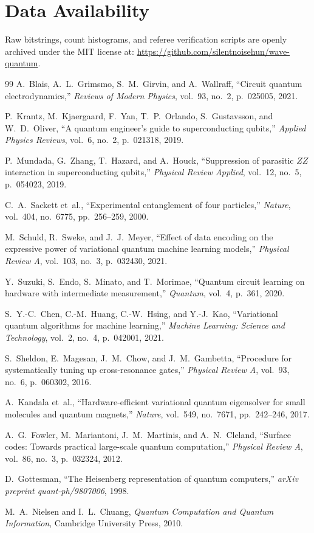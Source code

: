 \documentclass[11pt,a4paper]{article}
\begin{document}
\section*{Data Availability}
Raw bitstrings, count histograms, and referee verification scripts are openly archived under the MIT license at: \url{https://github.com/silentnoisehun/wave-quantum}.

\begin{thebibliography}{99}
A.~Blais, A.~L.~Grimsmo, S.~M.~Girvin, and A.~Wallraff,
``Circuit quantum electrodynamics,''
\emph{Reviews of Modern Physics}, vol.~93, no.~2, p.~025005, 2021.

P.~Krantz, M.~Kjaergaard, F.~Yan, T.~P.~Orlando, S.~Gustavsson, and W.~D.~Oliver,
``A quantum engineer's guide to superconducting qubits,''
\emph{Applied Physics Reviews}, vol.~6, no.~2, p.~021318, 2019.

P.~Mundada, G.~Zhang, T.~Hazard, and A.~Houck,
``Suppression of parasitic $ZZ$ interaction in superconducting qubits,''
\emph{Physical Review Applied}, vol.~12, no.~5, p.~054023, 2019.

C.~A.~Sackett et~al.,
``Experimental entanglement of four particles,''
\emph{Nature}, vol.~404, no.~6775, pp.~256--259, 2000.

M.~Schuld, R.~Sweke, and J.~J.~Meyer,
``Effect of data encoding on the expressive power of variational quantum machine learning models,''
\emph{Physical Review A}, vol.~103, no.~3, p.~032430, 2021.

Y.~Suzuki, S.~Endo, S.~Minato, and T.~Morimae,
``Quantum circuit learning on hardware with intermediate measurement,''
\emph{Quantum}, vol.~4, p.~361, 2020.

S.~Y.-C.~Chen, C.-M.~Huang, C.-W.~Hsing, and Y.-J.~Kao,
``Variational quantum algorithms for machine learning,''
\emph{Machine Learning: Science and Technology}, vol.~2, no.~4, p.~042001, 2021.

S.~Sheldon, E.~Magesan, J.~M.~Chow, and J.~M.~Gambetta,
``Procedure for systematically tuning up cross-resonance gates,''
\emph{Physical Review A}, vol.~93, no.~6, p.~060302, 2016.

A.~Kandala et~al.,
``Hardware-efficient variational quantum eigensolver for small molecules and quantum magnets,''
\emph{Nature}, vol.~549, no.~7671, pp.~242--246, 2017.

A.~G.~Fowler, M.~Mariantoni, J.~M.~Martinis, and A.~N.~Cleland,
``Surface codes: Towards practical large-scale quantum computation,''
\emph{Physical Review A}, vol.~86, no.~3, p.~032324, 2012.

D.~Gottesman,
``The Heisenberg representation of quantum computers,''
\emph{arXiv preprint quant-ph/9807006}, 1998.

M.~A.~Nielsen and I.~L.~Chuang,
\emph{Quantum Computation and Quantum Information},
Cambridge University Press, 2010.
\end{thebibliography}
\end{document}
